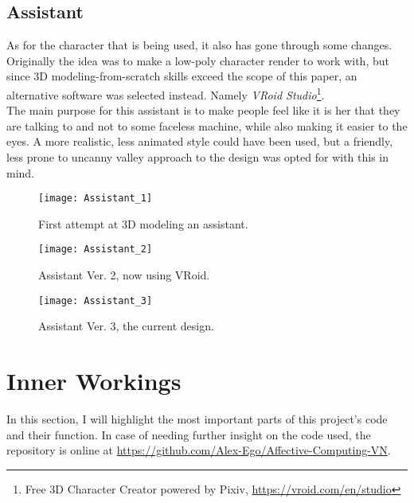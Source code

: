 \subsection{Assistant}
As for the character that is being used, it also has gone through some changes. Originally the idea was to make a low-poly character render to work with, but since 3D modeling-from-scratch skills exceed the scope of this paper, an alternative software was selected instead. Namely \textit{VRoid Studio}\footnote{Free 3D Character Creator powered by Pixiv, \url{https://vroid.com/en/studio}}.\\
The main purpose for this assistant is to make people feel like it is her that they are talking to and not to some faceless machine, while also making it easier to the eyes. A more realistic, less animated style could have been used, but a friendly, less prone to uncanny valley approach to the design was opted for with this in mind.
\begin{figure}[!bht]
	\centering
	\texttt{[image: Assistant\_1]}
	\caption{First attempt at 3D modeling an assistant.}
	\label{fig:assistant1}
\end{figure}
\begin{figure}[!bht]
	\centering
	\texttt{[image: Assistant\_2]}
	\caption{Assistant Ver. 2, now using VRoid.}
	\label{fig:assistant2}
\end{figure}
\begin{figure}[!bht]
	\centering
	\texttt{[image: Assistant\_3]}
	\caption{Assistant Ver. 3, the current design.}
	\label{fig:assistant3}
\end{figure}
\pagebreak

\section{Inner Workings}
In this section, I will highlight the most important parts of this project's code and their function. In case of needing further insight on the code used, the repository is online at \url{https://github.com/Alex-Ego/Affective-Computing-VN}.
